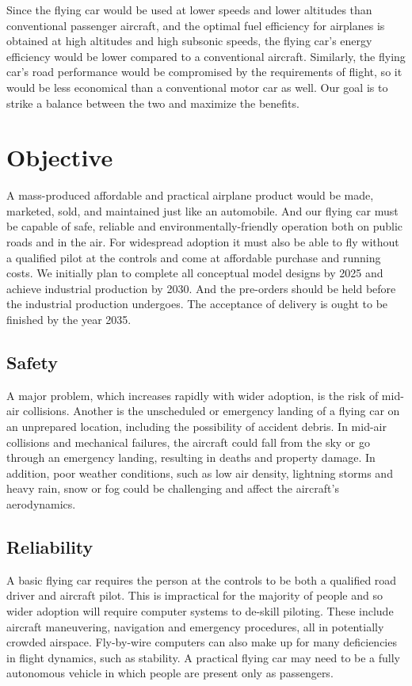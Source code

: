 Since the flying car would be used at lower speeds and lower altitudes than conventional passenger aircraft, and the optimal fuel efficiency for airplanes is obtained at high altitudes and high subsonic speeds, the flying car's energy efficiency would be lower compared to a conventional aircraft. Similarly, the flying car's road performance would be compromised by the requirements of flight, so it would be less economical than a conventional motor car as well. Our goal is to strike a balance between the two and maximize the benefits.

\section{Objective}

A mass-produced affordable and practical airplane product would be made, marketed, sold, and maintained just like an automobile. And our flying car must be capable of safe, reliable and environmentally-friendly operation both on public roads and in the air. For widespread adoption it must also be able to fly without a qualified pilot at the controls and come at affordable purchase and running costs. We initially plan to complete all conceptual model designs by 2025 and achieve industrial production by 2030. And the pre-orders should be held before the industrial production undergoes. The acceptance of delivery is ought to be finished by the year 2035.

\subsection{Safety}

A major problem, which increases rapidly with wider adoption, is the risk of mid-air collisions. Another is the unscheduled or emergency landing of a flying car on an unprepared location, including the possibility of accident debris. In mid-air collisions and mechanical failures, the aircraft could fall from the sky or go through an emergency landing, resulting in deaths and property damage. In addition, poor weather conditions, such as low air density, lightning storms and heavy rain, snow or fog could be challenging and affect the aircraft's aerodynamics.

\subsection{Reliability}

A basic flying car requires the person at the controls to be both a qualified road driver and aircraft pilot. This is impractical for the majority of people and so wider adoption will require computer systems to de-skill piloting. These include aircraft maneuvering, navigation and emergency procedures, all in potentially crowded airspace. Fly-by-wire computers can also make up for many deficiencies in flight dynamics, such as stability. A practical flying car may need to be a fully autonomous vehicle in which people are present only as passengers.

